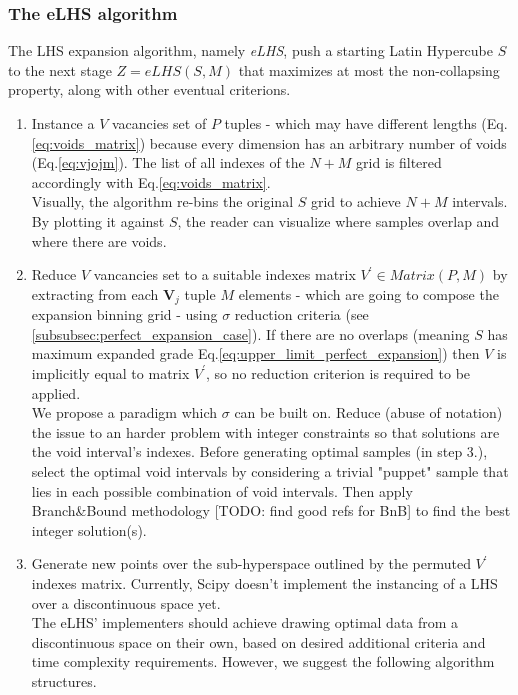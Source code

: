 \documentclass[12pt]{extarticle}
\newcommand{\meqref}[1]{Eq.\ref{#1}}
\begin{document}
\subsubsection{The eLHS algorithm}
\label{subsubsec:algorithm}
The LHS expansion algorithm, namely \textit{eLHS}, push a starting Latin Hypercube $S$ to the next stage $Z = eLHS(S, M)$ that maximizes at most the non-collapsing property, along with other eventual criterions.

\begin{enumerate}
\item Instance a $V$ vacancies set of $P$ tuples - which may have different lengths (\meqref{eq:voids_matrix}) because every dimension has an arbitrary number of voids (\meqref{eq:vjojm}). The list of all indexes of the $N+M$ grid is filtered accordingly with \meqref{eq:voids_matrix}. \\ 
Visually, the algorithm re-bins the original $S$ grid to achieve $N+M$ intervals. By plotting it against $S$, the reader can visualize where samples overlap and where there are voids.

\item Reduce $V$ vancancies set to a suitable indexes matrix $V^\prime \in Matrix(P, M)$ by extracting from each $\textbf{V}_j$ tuple $M$ elements - which are going to compose the expansion binning grid - using $\sigma$ reduction criteria (see \cref{subsubsec:perfect_expansion_case}). If there are no overlaps (meaning $S$ has maximum expanded grade \meqref{eq:upper_limit_perfect_expansion}) then $V$ is implicitly equal to matrix $V^\prime$, so no reduction criterion is required to be applied. \\
We propose a paradigm which $\sigma$ can be built on. Reduce (abuse of notation) the issue to an harder problem with integer constraints so that solutions are the void interval's indexes. Before generating optimal samples (in step 3.), select the optimal void intervals by considering a trivial "puppet" sample that lies in each possible combination of void intervals. Then apply Branch{\&}Bound methodology [TODO: find good refs for BnB] to find the best integer solution(s).

\item Generate new points over the sub-hyperspace outlined by the permuted $V^\prime$ indexes matrix. Currently, Scipy doesn't implement the instancing of a LHS over a discontinuous space yet.\\
The eLHS' implementers should achieve drawing optimal data from a discontinuous space on their own, based on desired additional criteria and time complexity requirements. However, we suggest the following algorithm structures.
	

\end{enumerate}
\end{document}
